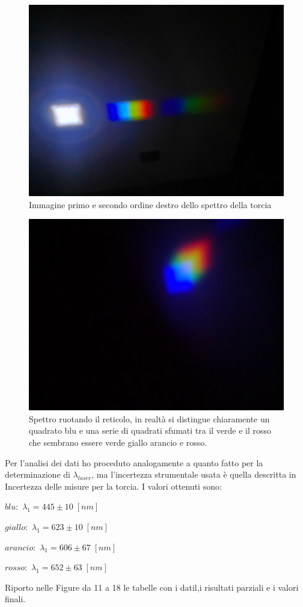 \documentclass{article}
\begin{document}
\begin{figure}[h!]
  \centering
  \includegraphics[width=0.4\linewidth]{IM torcia}
  \caption{Immagine primo e secondo ordine destro dello spettro della torcia}
\end{figure}

\begin{figure}[h!]
  \centering
  \includegraphics[width=0.4\linewidth]{IM torcia storta}
  \caption{Spettro ruotando il reticolo, in realtà si distingue chiaramente un quadrato blu e una serie di quadrati sfumati tra il verde e il rosso che sembrano essere verde giallo arancio e rosso.}
\end{figure}

Per l'analisi dei dati ho proceduto analogamente a quanto fatto per la determinazione di $\lambda_{laser}$, ma l'incertezza strumentale usata è quella descritta in Incertezza delle misure per la torcia.
I valori ottenuti sono:

\vspace{3mm}

\begin{centering}
$blu:$ \;\;\;\;\;\; $\lambda_1 = 445 \pm 10\; [nm]$

$giallo:$ \;\; $\lambda_1 = 623 \pm 10\; [nm]$ 

$arancio:$ $\lambda_1 = 606 \pm 67\; [nm]$ 

 $rosso:$ \;\;\; $\lambda_1 = 652 \pm 63\; [nm]$ 

\end{centering}

\vspace{3mm}

Riporto nelle Figure da 11 a 18 le tabelle con i datil,i risultati parziali e i valori finali.
\end{document}

